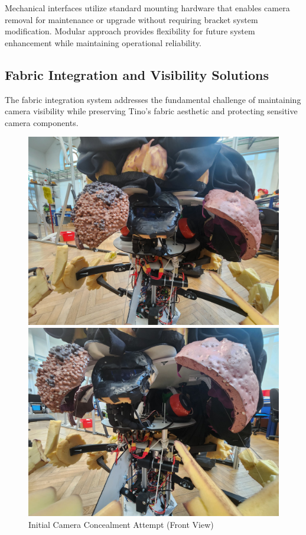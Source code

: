 Mechanical interfaces utilize standard mounting hardware that enables camera removal for maintenance or upgrade without requiring bracket system modification. Modular approach provides flexibility for future system enhancement while maintaining operational reliability.

\subsection{Fabric Integration and Visibility Solutions}

The fabric integration system addresses the fundamental challenge of maintaining camera visibility while preserving Tino's fabric aesthetic and protecting sensitive camera components.
\begin{figure}[H]
    \centering
    \begin{minipage}{0.45\textwidth}
        \centering
        \includegraphics[width=\textwidth]{Images/FirstTryCameraHiding.jpg}
        \caption{Initial Camera Concealment Attempt (Front View)}
        \label{fig:first_try_camera_hiding}
    \end{minipage}
    \hfill
    \begin{minipage}{0.45\textwidth}
        \centering
        \includegraphics[width=\textwidth]{Images/FirstTryCameraHiding (3).jpg}

\end{minipage}
\end{figure}
